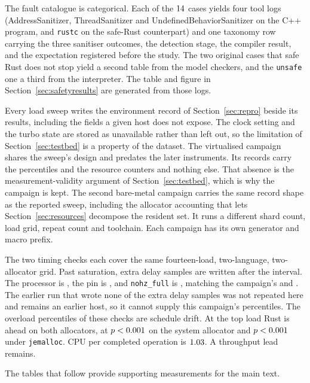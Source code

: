 \documentclass[english,oneside,a4paper,censored,csm,software-track-2020]{HYthesisML}
\begin{document}
\begin{appendices}
The fault catalogue is categorical. Each of the $14$ cases yields four tool logs
(AddressSanitizer, ThreadSanitizer and UndefinedBehaviorSanitizer on the C++ program, and
\texttt{rustc} on the safe-Rust counterpart) and one taxonomy row carrying the three sanitiser
outcomes, the detection stage, the compiler result, and the expectation registered before the
study. The two original cases that safe Rust does not stop yield a second table from the model checkers, and the
\texttt{unsafe} one a third from the interpreter. The table and figure in
Section~\ref{sec:safetyresults} are generated from those logs.

Every load sweep writes the environment record of Section~\ref{sec:repro} beside its results,
including the fields a given host does not expose. The clock setting and the turbo state are stored as
unavailable rather than left out, so the limitation of Section~\ref{sec:testbed} is a property
of the dataset. The virtualised campaign shares the sweep's design and predates the later
instruments. Its records carry the percentiles and the resource counters and nothing else. That
absence is the measurement-validity argument of Section~\ref{sec:testbed}, which is why the
campaign is kept. The second bare-metal campaign carries the same record shape as the reported
sweep, including the allocator accounting that lets Section~\ref{sec:resources} decompose the
resident set. It runs a different shard count, load grid, repeat count and toolchain. Each
campaign has its own generator and macro prefix.

The two timing checks each cover the same fourteen-load, two-language,
two-allocator grid. Past saturation, extra delay samples are written after the
interval. The processor is \ProbeAfterCpu{},
the pin is \ProbeAfterPinned{}, and \texttt{nohz\_full} is
\ProbeAfterNohzFull{}, matching the campaign's \MainCpu{} and
\texttt{\MainNohzFull}. The earlier run that wrote none of the extra delay samples was not repeated here and remains an earlier
host, so it cannot supply this campaign's percentiles. The overload percentiles of these checks are schedule drift. At the top load Rust
is ahead on both allocators, at $p <0.001$ on the system allocator
and $p <0.001$ under \texttt{jemalloc}. CPU per completed
operation is $1.03$.
A throughput lead remains.

The tables that follow provide supporting measurements for the main text.


\end{appendices}
\end{document}
